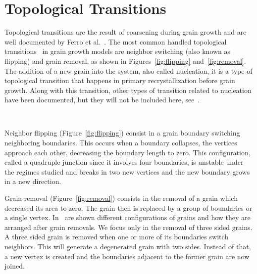 \section{Topological Transitions}\label{sec:topological_transitions}

Topological transitions are the result of coarsening during grain growth and are well documented by Ferro et al.~\cite{ferro1997elimination}. 
The most common handled topological transitions~\cite{kinderlehrermultiscale, Kinderlehrer2006, torres2015, van2016curvature} in grain growth models are neighbor switching (also known as flipping) and grain removal, as shown in Figures~\ref{fig:flipping} and~\ref{fig:removal}.
The addition of a new grain into the system, also called nucleation, it is a type of topological transition that happens in primary recrystallization before grain growth. Along with this transition, other types of transition related to nucleation have
been documented, but they will not be included here, see~\cite{pikekos2008stochastic}.

\begin{figure}[t]
    \centering
    \\
\end{figure}

Neighbor flipping (Figure~\ref{fig:flipping}) consist in a grain boundary switching neighboring boundaries. 
This occurs when a boundary collapses, the vertices approach each other, decreasing the boundary length to zero. 
This configuration, called a quadruple junction since it involves four boundaries, is unstable under the regimes studied and breaks in two new vertices and the new boundary grows in a new direction.

Grain removal (Figure~\ref{fig:removal}) consists in the removal of a grain which decreased its area to zero. 
The grain then is replaced by a group of boundaries or a single vertex. In~\cite{ferro1997elimination} are shown different configurations of grains and how they are arranged after grain removals. We focus only in the removal of three sided grains.
A three sided grain is removed when one or more of its boundaries switch neighbors. 
This will generate a degenerated grain with two sides. Instead of that, a new vertex is created and the boundaries adjacent to the former grain are now joined. 


